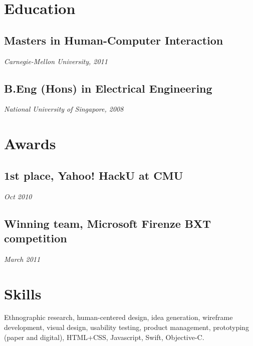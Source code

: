 \section[education]{Education}

\subsection[masters-in-human-computer-interaction]{Masters in
Human-Computer Interaction}

{\em Carnegie-Mellon University, 2011}

\subsection[b.eng-hons-in-electrical-engineering]{B.Eng (Hons) in
Electrical Engineering}

{\em National University of Singapore, 2008}

\section[awards]{Awards}

\subsection[st-place-yahoo-hacku-at-cmu]{1st place, Yahoo! HackU at CMU}

{\em Oct 2010}

\subsection[winning-team-microsoft-firenze-bxt-competition]{Winning
team, Microsoft Firenze BXT competition}

{\em March 2011}

\section[skills]{Skills}

Ethnographic research, human-centered design, idea generation, wireframe
development, visual design, usability testing, product management,
prototyping (paper and digital), HTML+CSS, Javascript, Swift,
Objective-C.
